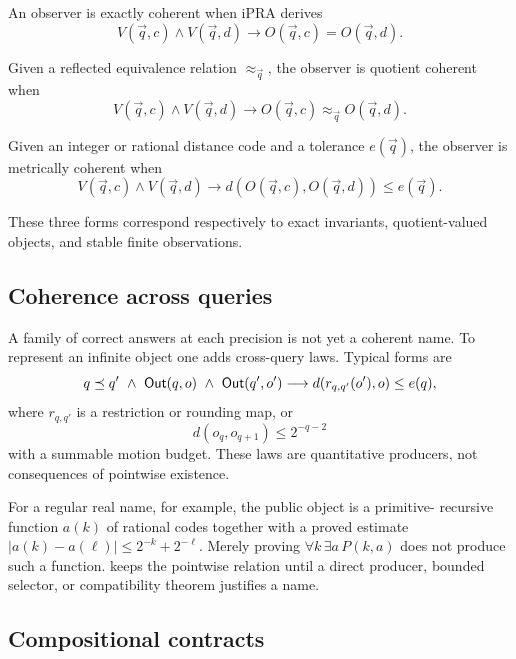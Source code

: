 \begin{definition}
An observer is exactly coherent when iPRA derives
\[
  V(\vec q,c)\wedge V(\vec q,d)
      \longrightarrow O(\vec q,c)=O(\vec q,d).
\]
\end{definition}

\begin{definition}
Given a reflected equivalence relation \(\approx_{\vec q}\), the observer is
quotient coherent when
\[
  V(\vec q,c)\wedge V(\vec q,d)
      \longrightarrow O(\vec q,c)\approx_{\vec q}O(\vec q,d).
\]
\end{definition}

\begin{definition}
Given an integer or rational distance code and a tolerance \(e(\vec q)\), the
observer is metrically coherent when
\[
  V(\vec q,c)\wedge V(\vec q,d)
      \longrightarrow d(O(\vec q,c),O(\vec q,d))\le e(\vec q).
\]
\end{definition}

These three forms correspond respectively to exact invariants, quotient-valued
objects, and stable finite observations.

\subsection{Coherence across queries}

A family of correct answers at each precision is not yet a coherent name.  To
represent an infinite object one adds cross-query laws.  Typical forms are
\[
  q\preceq q'\ \wedge\ \Out(q,o)\ \wedge\ \Out(q',o')
   \longrightarrow d(r_{q,q'}(o'),o)\le e(q),
\]
where \(r_{q,q'}\) is a restriction or rounding map, or
\[
  d(o_q,o_{q+1})\le 2^{-q-2}
\]
with a summable motion budget.  These laws are quantitative producers, not
consequences of pointwise existence.

For a regular real name, for example, the public object is a primitive-
recursive function \(a(k)\) of rational codes together with a proved estimate
\(|a(k)-a(\ell)|\le 2^{-k}+2^{-\ell}\).  Merely proving
\(\forall k\,\exists a\,P(k,a)\) does not produce such a function.  \Scope
keeps the pointwise relation until a direct producer, bounded selector, or
compatibility theorem justifies a name.

\subsection{Compositional contracts}

